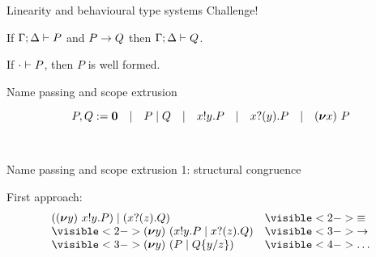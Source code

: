 \documentclass[aspectratio=169,hyperref={pdfpagelabels=false}]{beamer}
\begin{document}
\begin{frame}{Linearity and behavioural type systems}
  Challenge!
  
  \begin{theorem}
  If \( \Gamma;\Delta \vdash P \) and \( P \rightarrow Q \) then \( \Gamma;\Delta \vdash Q \).
  \end{theorem}

  \begin{theorem}
  If \( \cdot \vdash P \), then \( P \) is well formed.
  \end{theorem}
  
\end{frame}




\begin{frame}{Name passing and scope extrusion}

  \[P,Q := \bm{0}\quad|\quad P \mid Q\quad|\quad x ! y . P\quad|\quad x ? (y) . P\quad|\quad (\bm{\nu} x)~P\]

  \ \\

  
      
\end{frame}

\begin{frame}{Name passing and scope extrusion 1: structural congruence}

  First approach:\ \\

  \[
  \begin{array}{ll}
    \Ppar{(\Pres{y}{\Pout{x}{y}{P}})}{(\Pin{x}{z}{Q})} & \visible<2->{\equiv}\\
    \visible<2->{\Pres{y}{ (\Ppar{\Pout{x}{y}{P}}{\Pin{x}{z}{Q}})}} & \visible<3->{\rightarrow}\\
    \visible<3->{\Pres{y}{(\Ppar{P}{\subst{Q}{y}{z}})}} & \visible<4->{\dots}
  \end{array}
  \]
  \ \\ \ \\

      
\end{frame}
\end{document}
